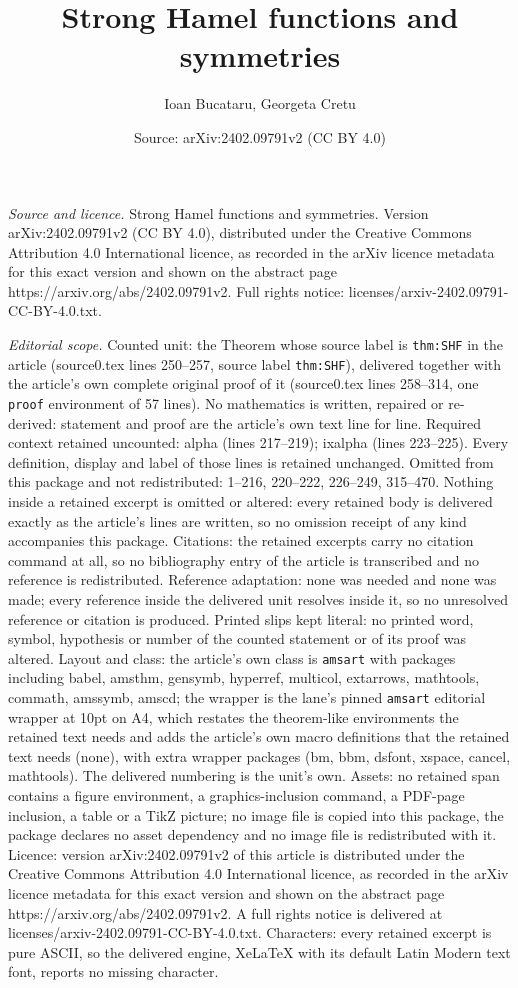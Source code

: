 \documentclass[10pt,a4paper]{amsart}
\title[Strong Hamel functions and symmetries]{Strong Hamel functions and symmetries}
\author{Ioan Bucataru, Georgeta Cretu}
\date{Source: arXiv:2402.09791v2 (CC BY 4.0)}
\begin{document}
\maketitle

\noindent\emph{Source and licence.} Strong Hamel functions and symmetries. Version arXiv:2402.09791v2 (CC BY 4.0), distributed under the Creative Commons Attribution 4.0 International licence, as recorded in the arXiv licence metadata for this exact version and shown on the abstract page https://arxiv.org/abs/2402.09791v2. Full rights notice: licenses/arxiv-2402.09791-CC-BY-4.0.txt.\par\smallskip

\noindent\textit{Editorial scope.} Counted unit: the Theorem whose source label is \texttt{thm:SHF} in the article (source0.tex lines 250--257, source label \texttt{thm:SHF}), delivered together with the article's own complete original proof of it (source0.tex lines 258--314, one \texttt{proof} environment of 57 lines). No mathematics is written, repaired or re-derived: statement and proof are the article's own text line for line. Required context retained uncounted: alpha (lines 217--219); ixalpha (lines 223--225). Every definition, display and label of those lines is retained unchanged. Omitted from this package and not redistributed: 1--216, 220--222, 226--249, 315--470. Nothing inside a retained excerpt is omitted or altered: every retained body is delivered exactly as the article's lines are written, so no omission receipt of any kind accompanies this package. Citations: the retained excerpts carry no citation command at all, so no bibliography entry of the article is transcribed and no reference is redistributed. Reference adaptation: none was needed and none was made; every reference inside the delivered unit resolves inside it, so no unresolved reference or citation is produced. Printed slips kept literal: no printed word, symbol, hypothesis or number of the counted statement or of its proof was altered. Layout and class: the article's own class is \texttt{amsart} with packages including babel, amsthm, gensymb, hyperref, multicol, extarrows, mathtools, commath, amssymb, amscd; the wrapper is the lane's pinned \texttt{amsart} editorial wrapper at 10pt on A4, which restates the theorem-like environments the retained text needs and adds the article's own macro definitions that the retained text needs (none), with extra wrapper packages (bm, bbm, dsfont, xspace, cancel, mathtools). The delivered numbering is the unit's own. Assets: no retained span contains a figure environment, a graphics-inclusion command, a PDF-page inclusion, a table or a TikZ picture; no image file is copied into this package, the package declares no asset dependency and no image file is redistributed with it. Licence: version arXiv:2402.09791v2 of this article is distributed under the Creative Commons Attribution 4.0 International licence, as recorded in the arXiv licence metadata for this exact version and shown on the abstract page https://arxiv.org/abs/2402.09791v2. A full rights notice is delivered at licenses/arxiv-2402.09791-CC-BY-4.0.txt. Characters: every retained excerpt is pure ASCII, so the delivered engine, XeLaTeX with its default Latin Modern text font, reports no missing character.
\end{document}
